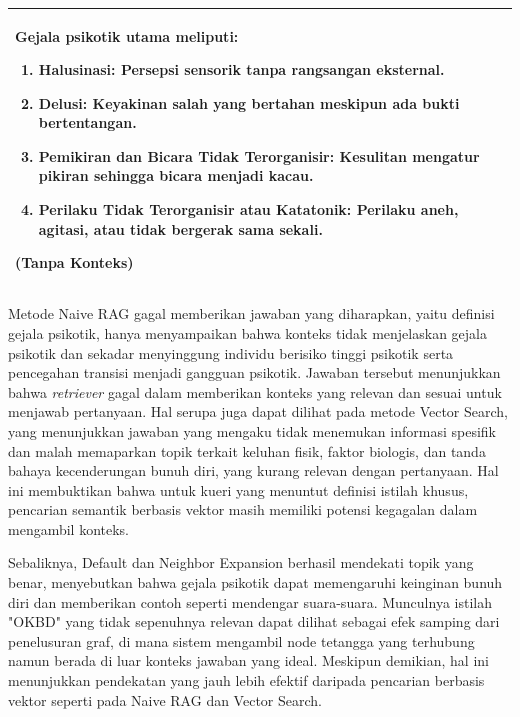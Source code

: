 \begin{longtable}{|p{2cm}|p{11cm}|}
\begin{minipage}[t]{10cm}
		Gejala psikotik utama meliputi:
		\begin{enumerate}
			\item \textbf{Halusinasi:} Persepsi sensorik tanpa rangsangan eksternal.
			\item \textbf{Delusi:} Keyakinan salah yang bertahan meskipun ada bukti bertentangan.
			\item \textbf{Pemikiran dan Bicara Tidak Terorganisir:} Kesulitan mengatur pikiran sehingga bicara menjadi kacau.
			\item \textbf{Perilaku Tidak Terorganisir atau Katatonik:} Perilaku aneh, agitasi, atau tidak bergerak sama sekali.
		\end{enumerate}
		(\textbf{Tanpa Konteks})
		\vspace{0.5em}
	\end{minipage}                                                                                                                                          \\
	\hline
\end{longtable}

Metode Naive RAG gagal memberikan jawaban yang diharapkan, yaitu definisi gejala psikotik, hanya menyampaikan bahwa konteks tidak menjelaskan gejala psikotik dan sekadar menyinggung individu berisiko tinggi psikotik serta pencegahan transisi menjadi gangguan psikotik.
Jawaban tersebut menunjukkan bahwa \textit{retriever} gagal dalam memberikan konteks yang relevan dan sesuai untuk menjawab pertanyaan.
Hal serupa juga dapat dilihat pada metode Vector Search, yang menunjukkan jawaban yang mengaku tidak menemukan informasi spesifik dan malah memaparkan topik terkait keluhan fisik, faktor biologis, dan tanda bahaya kecenderungan bunuh diri, yang kurang relevan dengan pertanyaan.
Hal ini membuktikan bahwa untuk kueri yang menuntut definisi istilah khusus, pencarian semantik berbasis vektor masih memiliki potensi kegagalan dalam mengambil konteks.


Sebaliknya, Default dan Neighbor Expansion berhasil mendekati topik yang benar, menyebutkan bahwa gejala psikotik dapat memengaruhi keinginan bunuh diri dan memberikan contoh seperti mendengar suara-suara.
Munculnya istilah "OKBD" yang tidak sepenuhnya relevan dapat dilihat sebagai efek samping dari penelusuran graf, di mana sistem mengambil node tetangga yang terhubung namun berada di luar konteks jawaban yang ideal.
Meskipun demikian, hal ini menunjukkan pendekatan yang jauh lebih efektif daripada pencarian berbasis vektor seperti pada Naive RAG dan Vector Search.

